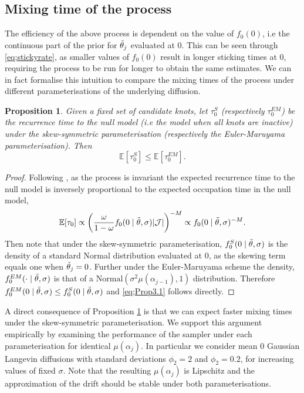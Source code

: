 \documentclass[ba,preprint]{imsart}
\theoremstyle{plain}
\newtheorem{proposition}{Proposition}[section]
\theoremstyle{definition}
\theoremstyle{remark}
\begin{document}
\subsection{Mixing time of the process}
\label{sec;Mixing}
The efficiency of the above process is dependent on the value of $f_0(0)$, i.e the continuous part of the prior for $\Tilde{\theta}_j$ evaluated at 0. This can be seen through \eqref{eq;stickyrate}, as smaller values of $f_0(0)$ result in longer sticking times at 0, requiring the process to be run for longer to obtain the same estimates. We can in fact formalise this intuition to compare the mixing times of the process under different parameterisations of the underlying diffusion.
\begin{proposition}
    \label{prop;Mixing} 
    Given a fixed set of candidate knots, let $\tau_0^{S}$ (respectively $\tau_0^{EM}$) be the recurrence time to the null model (i.e the model when all knots are inactive) under the skew-symmetric parameterisation (respectively the Euler-Maruyama parameterisation). Then
    \begin{equation}
        \label{eq;Prop3.1}
        \mathbb{E}[\tau_0^{S}] \leq \mathbb{E}[\tau_0^{EM}].
    \end{equation}
\end{proposition}
\begin{proof}
    Following \citet[Remark 2.4]{Bierkens2023a}, as the process is invariant the expected recurrence time to the null model is inversely proportional to the expected occupation time in the null model,
    \begin{equation}
        \label{eq;Mixing}
        \mathbb{E}[\tau_0] \propto \left(\frac{\omega}{1-\omega}f_0(0\mid \Tilde{\theta},\sigma)|\mathcal{J}|\right)^{-M} \propto f_0(0\mid \Tilde{\theta},\sigma)^{-M}.
    \end{equation}
    Then note that under the skew-symmetric parameterisation, $f^{S}_0(0\mid \Tilde{\theta},\sigma)$ is the density of a standard Normal distribution evaluated at 0, as the skewing term equals one when $\Tilde{\theta}_j = 0$. Further under the Euler-Maruyama scheme the density, $f^{EM}_0(\cdot\mid \Tilde{\theta},\sigma)$ is that of a $\text{Normal}(\sigma^2\mu(\alpha_{j-1}),1)$ distribution. Therefore $f^{EM}_0(0\mid \Tilde{\theta},\sigma) \leq f^{S}_0(0\mid \Tilde{\theta},\sigma)$ and \eqref{eq;Prop3.1} follows directly.
\end{proof}

A direct consequence of Proposition \ref{prop;Mixing} is that we can expect faster mixing times under the skew-symmetric parameterisation. We support this argument empirically by examining the performance of the sampler under each parameterisation for identical $\mu(\alpha_j)$. In particular we consider mean 0 Gaussian Langevin diffusions with standard deviations $\phi_2 = 2$ and $\phi_2 = 0.2$, for increasing values of fixed $\sigma$. Note that the resulting $\mu(\alpha_j)$ is Lipschitz and the approximation of the drift should be stable under both parameterisations. 
\end{document}
